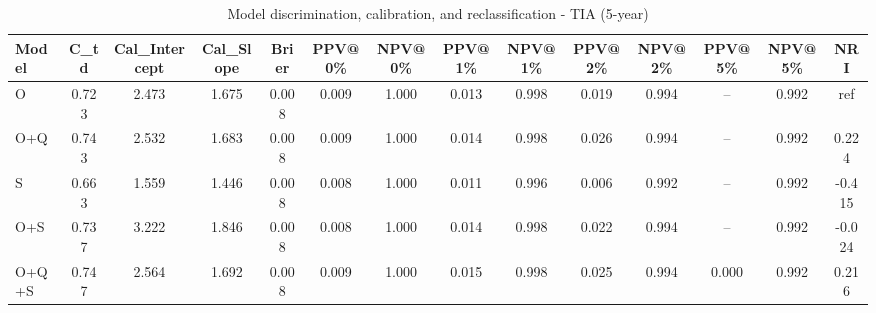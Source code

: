 \begin{table}[htbp]
\centering
\small
\caption{Model discrimination, calibration, and reclassification - TIA (5-year)}
\label{tab:perf_tia_5y}
\begin{tabular}{lccccccccccccc}
\toprule
Model & C\_td & Cal\_Intercept & Cal\_Slope & Brier & PPV@0\% & NPV@0\% & PPV@1\% & NPV@1\% & PPV@2\% & NPV@2\% & PPV@5\% & NPV@5\% & NRI \\
\midrule
O & 0.723 & 2.473 & 1.675 & 0.008 & 0.009 & 1.000 & 0.013 & 0.998 & 0.019 & 0.994 & -- & 0.992 & ref \\
O+Q & 0.743 & 2.532 & 1.683 & 0.008 & 0.009 & 1.000 & 0.014 & 0.998 & 0.026 & 0.994 & -- & 0.992 & 0.224 \\
S & 0.663 & 1.559 & 1.446 & 0.008 & 0.008 & 1.000 & 0.011 & 0.996 & 0.006 & 0.992 & -- & 0.992 & -0.415 \\
O+S & 0.737 & 3.222 & 1.846 & 0.008 & 0.008 & 1.000 & 0.014 & 0.998 & 0.022 & 0.994 & -- & 0.992 & -0.024 \\
O+Q+S & 0.747 & 2.564 & 1.692 & 0.008 & 0.009 & 1.000 & 0.015 & 0.998 & 0.025 & 0.994 & 0.000 & 0.992 & 0.216 \\
\bottomrule
\end{tabular}
\end{table}